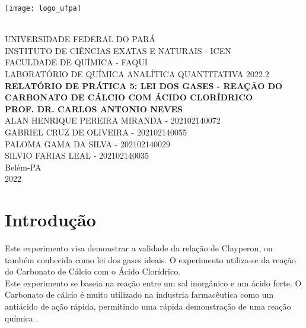 \documentclass[a4paper, 11pt]{article}
\begin{document}
    \thispagestyle{empty} %

    \begin{center}
        \parbox{3cm}{\texttt{[image: logo\_ufpa]}} \\
        {\vspace {1.0cm}}
        {\Large \uppercase {Universidade Federal do Pará}}\\
        {\Large \uppercase {Instituto de Ciências Exatas e Naturais - ICEN}}\\
        \vspace{3cm}
        {\Large \uppercase {Faculdade de Química - FAQUI}}\\
        {\Large \uppercase {Laboratório de Química Analítica Quantitativa 2022.2} }\\
        \vspace{3cm}
        {\Large \bf \uppercase {Relatório de Prática 5: Lei dos Gases - Reação do Carbonato de Cálcio com Ácido Clorídrico}}\\
        {\Large \bf \uppercase {Prof. Dr. Carlos Antonio Neves}}\\
        \vspace{3cm}
        {\Large \uppercase {Alan Henrique Pereira Miranda - 202102140072}}\\
        {\Large \uppercase {Gabriel Cruz de Oliveira - 202102140055}}\\
        {\Large \uppercase {Paloma Gama da Silva - 202102140029}}\\
        {\Large \uppercase {Silvio Farias Leal - 202102140035}}\\
        \vspace{0.5cm}
        {\Large  {Belém-PA \\ 2022}}
    \end{center}

    \newpage
    \section{Introdução}\label{sec:introducao}

    \indent Este experimento visa demonstrar a validade da relação de Clayperon, ou também conhecida como lei dos gases ideais. O experimento utiliza-se da reação do Carbonato de Cálcio com o Ácido Clorídrico\@.\\
    \indent Este experimento se baseia na reação entre um sal inorgânico e um ácido forte. O Carbonato de cálcio é muito utilizado na industria farmacêutica como um antiácido de ação rápida, permitindo uma rápida demonstração de uma reação química \@.\\
\end{document}

